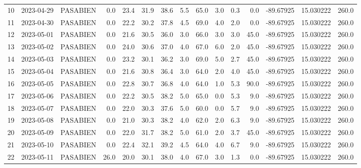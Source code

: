 \documentclass[12pt]{article}
\begin{document}
\begin{center}
\begin{tabular}{lllrrrrrrrrrrrr}
10  & 2023-04-29 &  PASABIEN &     0.0 &  23.4 &   31.9 &  38.6 &        5.5 &     65.0 &  3.0 &         0.3 &         0.0 & -89.67925 &  15.030222 &    260.0 \\
11  & 2023-04-30 &  PASABIEN &     0.0 &  22.2 &   30.2 &  37.8 &        4.5 &     69.0 &  4.0 &         2.0 &         0.0 & -89.67925 &  15.030222 &    260.0 \\
12  & 2023-05-01 &  PASABIEN &     0.0 &  21.6 &   30.5 &  36.0 &        3.0 &     66.0 &  3.0 &         3.0 &        45.0 & -89.67925 &  15.030222 &    260.0 \\
13  & 2023-05-02 &  PASABIEN &     0.0 &  24.0 &   30.6 &  37.0 &        4.0 &     67.0 &  6.0 &         2.0 &        45.0 & -89.67925 &  15.030222 &    260.0 \\
14  & 2023-05-03 &  PASABIEN &     0.0 &  23.2 &   30.1 &  36.2 &        3.0 &     69.0 &  5.0 &         2.7 &        45.0 & -89.67925 &  15.030222 &    260.0 \\
15  & 2023-05-04 &  PASABIEN &     0.0 &  21.6 &   30.8 &  36.4 &        3.0 &     64.0 &  2.0 &         4.0 &        45.0 & -89.67925 &  15.030222 &    260.0 \\
16  & 2023-05-05 &  PASABIEN &     0.0 &  22.8 &   30.7 &  36.8 &        4.0 &     64.0 &  1.0 &         5.3 &        90.0 & -89.67925 &  15.030222 &    260.0 \\
17  & 2023-05-06 &  PASABIEN &     0.0 &  22.2 &   30.5 &  38.2 &        5.0 &     65.0 &  0.0 &         5.3 &         9.0 & -89.67925 &  15.030222 &    260.0 \\
18  & 2023-05-07 &  PASABIEN &     0.0 &  22.0 &   30.3 &  37.6 &        5.0 &     60.0 &  0.0 &         5.7 &         9.0 & -89.67925 &  15.030222 &    260.0 \\
19  & 2023-05-08 &  PASABIEN &     0.0 &  21.0 &   30.3 &  38.2 &        4.0 &     62.0 &  2.0 &         6.3 &         9.0 & -89.67925 &  15.030222 &    260.0 \\
20  & 2023-05-09 &  PASABIEN &     0.0 &  22.0 &   31.7 &  38.2 &        5.0 &     61.0 &  2.0 &         3.7 &        45.0 & -89.67925 &  15.030222 &    260.0 \\
21  & 2023-05-10 &  PASABIEN &     0.0 &  22.4 &   32.1 &  39.2 &        4.5 &     64.0 &  4.0 &         6.7 &         9.0 & -89.67925 &  15.030222 &    260.0 \\
22  & 2023-05-11 &  PASABIEN &    26.0 &  20.0 &   30.1 &  38.0 &        4.0 &     67.0 &  3.0 &         1.3 &         0.0 & -89.67925 &  15.030222 &    260.0 \\

\end{tabular}
\end{center}
\end{document}
